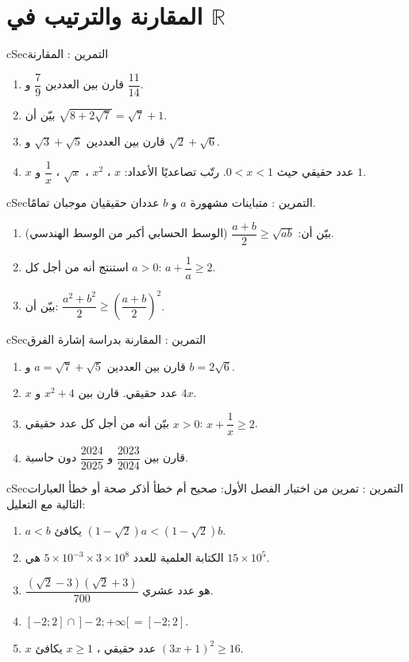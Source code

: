 \documentclass[12pt,a4paper]{article}
\newenvironment{BOX}[2]{\begin{otherlanguage}{english}\begin{arbox}{#1}{#2}}{\end{arbox}\end{otherlanguage}}
\newcounter{exo}
\newenvironment{tamrin}[1]{\stepcounter{exo}\begin{BOX}{cSec}{التمرين \theexo: #1}}{\end{BOX}}
\begin{document}
\section{المقارنة والترتيب في $\mathbb{R}$}
\begin{tamrin}{المقارنة}
\begin{enumerate}
\item قارن بين العددين $\dfrac79$ و $\dfrac{11}{14}$.
\item بيّن أن $\sqrt{8+2\sqrt7}=\sqrt7+1$.
\item قارن بين العددين $\sqrt3+\sqrt5$ و $\sqrt2+\sqrt6$.
\item $x$ عدد حقيقي حيث $0<x<1$. رتّب تصاعديًا الأعداد: $x$ ، $x^2$ ، $\sqrt x$ ، $\dfrac1x$ و $1$.
\end{enumerate}
\end{tamrin}

\begin{tamrin}{متباينات مشهورة}
$a$ و $b$ عددان حقيقيان موجبان تمامًا.
\begin{enumerate}
\item بيّن أن: $\dfrac{a+b}2\geqslant\sqrt{ab}$ \quad (الوسط الحسابي أكبر من الوسط الهندسي).
\item استنتج أنه من أجل كل $a>0$: $a+\dfrac1a\geqslant2$.
\item بيّن أن: $\dfrac{a^2+b^2}2\geqslant\left(\dfrac{a+b}2\right)^2$.
\end{enumerate}
\end{tamrin}

\begin{tamrin}{المقارنة بدراسة إشارة الفرق}
\begin{enumerate}
\item قارن بين العددين $a=\sqrt7+\sqrt5$ و $b=2\sqrt6$.
\item $x$ عدد حقيقي. قارن بين $x^2+4$ و $4x$.
\item بيّن أنه من أجل كل عدد حقيقي $x>0$: $x+\dfrac1x\geqslant2$.
\item قارن بين $\dfrac{2023}{2024}$ و $\dfrac{2024}{2025}$ دون حاسبة.
\end{enumerate}
\end{tamrin}

\begin{tamrin}{تمرين من اختبار الفصل الأول: صحيح أم خطأ}
أذكر صحة أو خطأ العبارات التالية مع التعليل:
\begin{enumerate}
\item $a<b$ يكافئ $\left(1-\sqrt2\right)a<\left(1-\sqrt2\right)b$.
\item الكتابة العلمية للعدد $5\times10^{-3}\times3\times10^8$ هي $15\times10^5$.
\item $\dfrac{\left(\sqrt2-3\right)\left(\sqrt2+3\right)}{700}$ هو عدد عشري.
\item $[-2;2]\cap\,]-2;+\infty[\,=[-2;2]$.
\item $x$ عدد حقيقي ، $x\geqslant1$ يكافئ $(3x+1)^2\geqslant16$.
\end{enumerate}
\end{tamrin}
\end{document}
